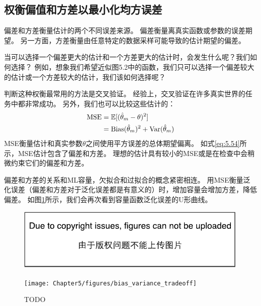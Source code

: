 
\subsection{权衡偏值和方差以最小化均方误差}
\label{sec:trading_off_bias_and_variance_to_minimize_mean_squared_error}
偏差和方差衡量估计的两个不同误差来源。
偏差衡量离真实函数或参数的误差期望。
另一方面，方差衡量由任意特定的数据采样可能导致的估计期望的偏差。

当可以选择一个偏差更大的估计和一个方差更大的估计时，会发生什么呢？我们如何选择？
例如，想象我们希望近似图5.2中的函数，我们只可以选择一个偏差较大的估计或一个方差较大的估计，我们该如何选择呢？

判断这种权衡最常用的方法是交叉验证。
经验上，交叉验证在许多真实世界的任务中都非常成功。
另外，我们也可以比较这些估计的：
\begin{align}
    \text{MSE} &= \mathbb{E}[ ( \hat{\theta}_m - \theta  )^2 ] \\
        &= \text{Bias}( \hat{\theta}_m )^2 + \text{Var}( \hat{\theta}_m ) \label{eq:5.54}
\end{align}
MSE衡量估计和真实参数$\theta$之间使用平方误差的总体期望偏离。
如式\ref{eq:5.54}所示，MSE估计包含了偏差和方差。
理想的估计具有较小的MSE或是在检查中会稍微约束它们的偏差和方差。

偏差和方差的关系和\gls{ML}容量，欠拟合和过拟合的概念紧密相连。
用MSE衡量泛化误差（偏差和方差对于泛化误差都是有意义的）时，增加容量会增加方差，降低偏差。
如图\ref{fig:chap5_bias_variance_tradeoff}所示，我们会再次看到容量函数泛化误差的U形曲线。

\begin{figure}[!htb]
\ifOpenSource
\centerline{\includegraphics{figure.pdf}}
\else
\centerline{\texttt{[image: Chapter5/figures/bias\_variance\_tradeoff]}}
\fi
\caption{TODO}
\label{fig:chap5_bias_variance_tradeoff}
\end{figure}


